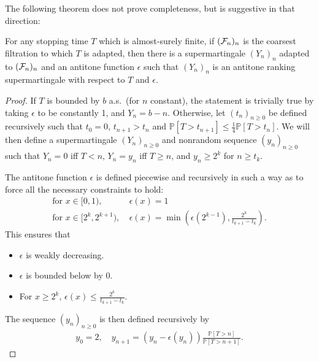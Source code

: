 The following theorem does not prove completeness, but is suggestive in that direction:
\begin{theorem}
For any stopping time $T$ which is almost-surely finite, if $(\mathcal{F}_n)_n$ is the coarsest filtration to which $T$ is adapted, then there is a supermartingale $(Y_n)_n$ adapted to $(\mathcal{F}_n)_n$ and an antitone function $\epsilon$ such that $(Y_n)_n$ is an antitone ranking supermartingale with respect to $T$ and $\epsilon$.
\end{theorem}


\begin{proof}
If $T$ is bounded by $b$ a.s.~(for $n$ constant), the statement is trivially true by taking $\epsilon$ to be constantly 1, and $Y_n = b - n$.
Otherwise, let $(t_n)_{n \geq 0}$ be defined recursively such that $t_0 = 0$, $t_{n+1} > t_n$ and $\mathbb P[T > t_{n+1}] \leq \frac 1 4 \mathbb P[T > t_n]$.
We will then define a supermartingale $(Y_n)_{n \geq 0}$ and nonrandom sequence $(y_n)_{n \geq 0}$ such that $Y_n = 0$ iff $T < n$, $Y_n = y_n$ iff $T \geq n$, and $y_n \geq 2^k$ for $n \geq t_k$.

The antitone function $\epsilon$ is defined piecewise and recursively in such a way as to force all the necessary constraints to hold:
\begin{align*}
    \text{for }x \in [0,1),\ &\epsilon(x) = 1 \\
    \text{for }x \in [2^k,2^{k+1}),\ &\epsilon(x) = \min \left (\epsilon(2^{k-1}), \frac{2^k}{t_{k+1}-t_k} \right ).
\end{align*}
This ensures that
\begin{itemize}
\item $\epsilon$ is weakly decreasing. 
\item $\epsilon$ is bounded below by 0.
\item For $x \geq 2^k$, $\epsilon(x) \leq \frac{2^k}{t_{k+1}-t_k}$. 
 
\end{itemize}

The sequence $(y_n)_{n \geq 0}$ is then defined recursively by
\begin{align*}
    y_0 = 2, \quad
    y_{n+1} = (y_n - \epsilon(y_n)) \frac{\mathbb P[T > n]}{\mathbb P[T > n+1]}.
\end{align*}


\end{proof}
